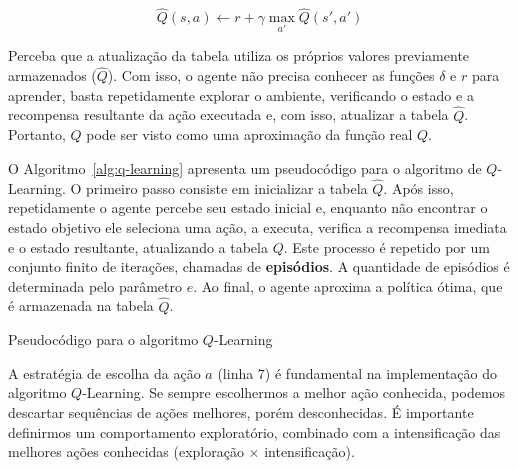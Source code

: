 $$
\widehat{Q}(s, a) \gets r + \gamma \max_{a'} \widehat{Q}(s', a')
$$

Perceba que a atualização da tabela utiliza os próprios valores previamente armazenados ($\widehat{Q}$). Com isso, o agente não precisa conhecer as funções $\delta$ e $r$ para aprender, basta repetidamente explorar o ambiente, verificando o estado e a recompensa resultante da ação executada e, com isso, atualizar a tabela $\widehat{Q}$. Portanto, $\widehat{Q}$ pode ser visto como uma aproximação da função real $Q$.

O Algoritmo~\ref{alg:q-learning} apresenta um pseudocódigo para o algoritmo de $Q$-Learning. O primeiro passo consiste em inicializar a tabela $\widehat{Q}$. Após isso, repetidamente o agente percebe seu estado inicial e, enquanto não encontrar o estado objetivo ele seleciona uma ação, a executa, verifica a recompensa imediata e o estado resultante, atualizando a tabela $Q$. Este processo é repetido por um conjunto finito de iterações, chamadas de \textbf{episódios}. A quantidade de episódios é determinada pelo parâmetro $e$. Ao final, o agente aproxima a política ótima, que é armazenada na tabela $\widehat{Q}$.

\begin{algorithm}[h]
	\DontPrintSemicolon
	
	
	\caption{Pseudocódigo para o algoritmo $Q$-Learning}
	\label{alg:q-learning}
\end{algorithm}

A estratégia de escolha da ação $a$ (linha 7) é fundamental na implementação do algoritmo $Q$-Learning. Se sempre escolhermos a melhor ação conhecida, podemos descartar sequências de ações melhores, porém desconhecidas. É importante definirmos um comportamento exploratório, combinado com a intensificação das melhores ações conhecidas (exploração $\times$ intensificação).

